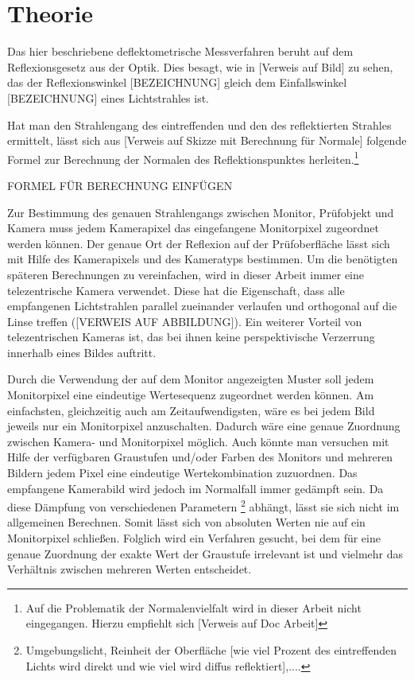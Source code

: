 
\chapter{Theorie}

Das hier beschriebene deflektometrische Messverfahren beruht auf dem Reflexionsgesetz aus der Optik. Dies besagt, wie in [Verweis auf Bild] zu sehen, das der Reflexionswinkel [BEZEICHNUNG] gleich dem Einfallswinkel [BEZEICHNUNG] eines Lichtstrahles ist.

Hat man den Strahlengang des eintreffenden und den des reflektierten Strahles ermittelt, lässt sich aus [Verweis auf Skizze mit Berechnung für Normale] folgende Formel zur Berechnung der Normalen des Reflektionspunktes herleiten.\footnote{Auf die Problematik der Normalenvielfalt wird in dieser Arbeit nicht eingegangen. Hierzu empfiehlt sich [Verweis auf Doc Arbeit]}

 
FORMEL FÜR BERECHNUNG EINFÜGEN


Zur Bestimmung des genauen Strahlengangs zwischen Monitor, Prüfobjekt und Kamera muss jedem Kamerapixel das eingefangene Monitorpixel zugeordnet werden können. Der genaue Ort der Reflexion auf der Prüfoberfläche lässt sich mit Hilfe des Kamerapixels und des Kameratyps bestimmen. Um die benötigten späteren Berechnungen zu vereinfachen, wird in dieser Arbeit immer eine telezentrische Kamera verwendet. Diese hat die Eigenschaft, dass alle empfangenen Lichtstrahlen parallel zueinander verlaufen und orthogonal auf die Linse treffen ([VERWEIS AUF ABBILDUNG]). Ein weiterer Vorteil von telezentrischen Kameras ist, das bei ihnen keine perspektivische Verzerrung innerhalb eines Bildes auftritt.

Durch die Verwendung der auf dem Monitor angezeigten Muster soll jedem Monitorpixel eine eindeutige Wertesequenz zugeordnet werden können. Am einfachsten, gleichzeitig auch am Zeitaufwendigsten, wäre es bei jedem Bild jeweils nur ein Monitorpixel anzuschalten. Dadurch wäre eine genaue Zuordnung zwischen Kamera- und Monitorpixel möglich. Auch könnte man versuchen mit Hilfe der verfügbaren Graustufen und/oder Farben des Monitors und mehreren Bildern jedem Pixel eine eindeutige Wertekombination zuzuordnen. Das empfangene Kamerabild wird jedoch im Normalfall immer gedämpft sein. Da diese Dämpfung von verschiedenen Parametern \footnote{Umgebungslicht, Reinheit der Oberfläche [wie viel Prozent des eintreffenden Lichts wird direkt und wie viel wird diffus reflektiert],....} abhängt, lässt sie sich nicht im allgemeinen Berechnen. Somit lässt sich von absoluten Werten nie auf ein Monitorpixel schließen. Folglich wird ein Verfahren gesucht, bei dem für eine genaue Zuordnung der exakte Wert der Graustufe irrelevant ist und vielmehr das Verhältnis zwischen mehreren Werten entscheidet.

